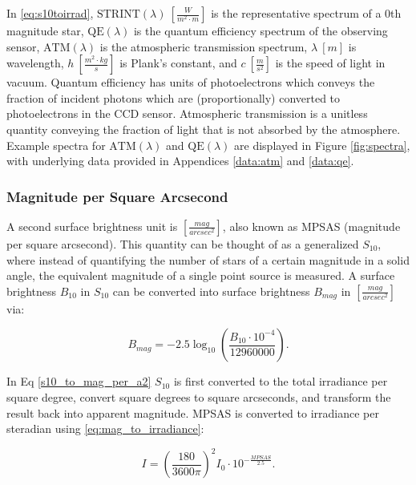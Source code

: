 In \ref{eq:s10toirrad}, $\textrm{STRINT}(\lambda) \: \left[ \frac{W}{m^2 \cdot m} \right]$ is the
representative spectrum of a 0th magnitude star, $\textrm{QE}(\lambda)$ is the quantum efficiency
spectrum of the observing sensor, $\textrm{ATM}(\lambda)$ is the atmospheric transmission spectrum, $\lambda \: [m]$ is wavelength, $h \: \left[
\frac{m^2 \cdot kg}{s} \right]$ is Plank's constant, and $c \: \left[ \frac{m}{s^2} \right]$ is the
speed of light in vacuum. Quantum efficiency has units of photoelectrons which conveys the fraction of incident photons which are (proportionally) converted to photoelectrons in the CCD sensor. Atmospheric transmission is a unitless quantity conveying the fraction of light that is not absorbed by the atmosphere. Example spectra for $\textrm{ATM}(\lambda)$ and $\textrm{QE}(\lambda)$ are displayed in Figure \ref{fig:spectra}, with underlying data provided in Appendices \ref{data:atm} and \ref{data:qe}.

\subsubsection{Magnitude per Square Arcsecond}

A second surface brightness unit is $\left[ \frac{mag}{arcsec^2} \right]$, also known as MPSAS (magnitude per square arcsecond). This quantity can be thought of as a generalized $S_{10}$, where instead of quantifying the number of stars of a certain
magnitude in a solid angle, the equivalent magnitude of a single point source is measured. A surface
brightness $B_{10}$ in $S_{10}$ can be converted into surface brightness $B_{mag}$ in 
$\left[ \frac{mag}{arcsec^2} \right]$ via:

\begin{equation} \label{s10_to_mag_per_a2}
	B_{mag} = -2.5 \log_{10}\left( \frac{B_{10} \cdot 10^{-4}}{12960000} \right).
\end{equation}

In Eq \ref{s10_to_mag_per_a2} $S_{10}$ is first converted to the total irradiance per square degree,
convert square degrees to square arcseconds, and transform the result back into apparent magnitude. MPSAS is converted to irradiance per steradian using \ref{eq:mag_to_irradiance}:

\begin{equation} \label{eq:mpsas_to_irrad_per_ster}
  I = \left( \frac{180}{ 3600\pi} \right)^2 I_0 \cdot 10^{-\frac{MPSAS}{2.5}}.
\end{equation}

